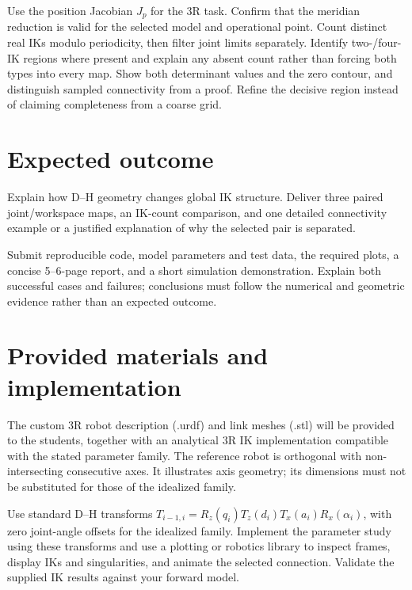 \documentclass[11pt,a4paper]{article}
\begin{document}
Use the position Jacobian $J_p$ for the 3R task.
Confirm that the meridian reduction is valid for the selected model and
operational point. Count distinct real IKs modulo periodicity, then filter
joint limits separately. Identify two-/four-IK regions where present and
explain any absent count rather than forcing both types into every map. Show both determinant values and the zero contour,
and distinguish sampled connectivity from a proof. Refine the decisive
region instead of claiming completeness from a coarse grid.

\section*{Expected outcome}
Explain how D--H geometry changes global IK structure. Deliver three paired
joint/workspace maps, an IK-count comparison, and one detailed connectivity
example or a justified explanation of why the selected pair is separated.

Submit reproducible code, model parameters and test data, the required plots,
a concise 5--6-page report, and a short simulation demonstration. Explain
both successful cases and failures; conclusions must follow the numerical
and geometric evidence rather than an expected outcome.

\section*{Provided materials and implementation}
The custom 3R robot description (.urdf) and link meshes (.stl) will be provided
to the students, together with an analytical 3R IK implementation compatible
with the stated parameter family. The reference robot is orthogonal with
non-intersecting consecutive axes. It illustrates axis geometry; its dimensions
must not be substituted for those of the idealized family.

Use standard D--H transforms
$T_{i-1,i}=R_z(q_i)T_z(d_i)T_x(a_i)R_x(\alpha_i)$, with zero joint-angle
offsets for the idealized family. Implement the parameter study using these
transforms and use a plotting or robotics library to inspect frames, display
IKs and singularities, and animate the selected connection. Validate the
supplied IK results against your forward model.
\end{document}
